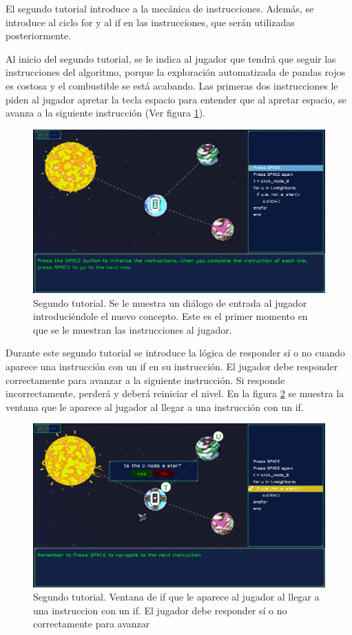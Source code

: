 El segundo tutorial introduce a la mecánica de instrucciones. Además, se introduce al ciclo for y al if en las instrucciones, que serán utilizadas posteriormente.

Al inicio del segundo tutorial, se le indica al jugador que tendrá que seguir las instrucciones del algoritmo, porque la 
exploración automatizada de pandas rojos es costosa y el combustible se está acabando. Las primeras dos instrucciones 
le piden al jugador apretar la tecla espacio para entender que al apretar espacio, se avanza a la siguiente instrucción (Ver figura \ref{SecondTutorial}).

\begin{figure}[h]
	\centering
	\includegraphics[scale=0.2]{imagenes/SecondTutorial.png}
	\caption{Segundo tutorial. Se le muestra un diálogo de entrada al jugador introduciéndole el nuevo concepto. Este es el primer momento en que se le muestran las instrucciones al jugador.}
	\label{SecondTutorial}
\end{figure}

Durante este segundo tutorial se introduce la lógica de responder sí o no cuando aparece una instrucción con un if en su instrucción. El jugador debe responder correctamente para avanzar a la siguiente instrucción. Si responde incorrectamente, perderá y deberá reiniciar el nivel. En la figura \ref{SecondTutorialShowingIf} se muestra la ventana que le aparece al jugador al llegar a una instrucción con un if.

\begin{figure}[h]
	\centering
	\includegraphics[scale=0.3]{imagenes/SecondTutorialShowingIf.png}
	\caption{Segundo tutorial. Ventana de if que le aparece al jugador al llegar a una instruccion con un if. El jugador debe responder sí o no correctamente para avanzar}
	\label{SecondTutorialShowingIf}
\end{figure}

